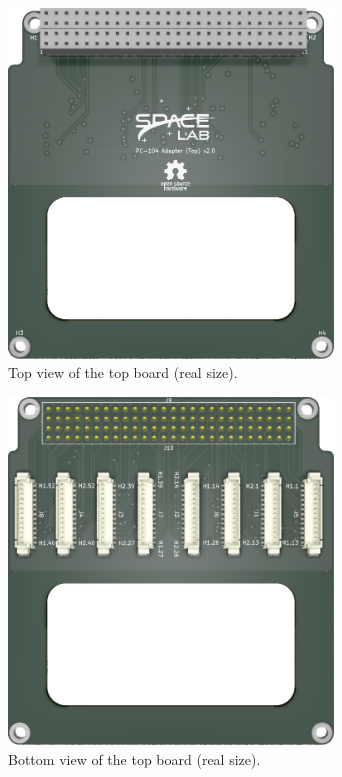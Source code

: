 \begin{figure}[!htb]
    \begin{center}
        \includegraphics[width=8.636cm]{figures/pc104-adapter-top-top}
        \caption{Top view of the top board (real size).}
        \label{fig:top-board-top}
    \end{center}
\end{figure}

\begin{figure}[!htb]
    \begin{center}
        \includegraphics[width=8.636cm]{figures/pc104-adapter-top-bottom}
        \caption{Bottom view of the top board (real size).}
        \label{fig:top-board-bottom}
    \end{center}
\end{figure}

